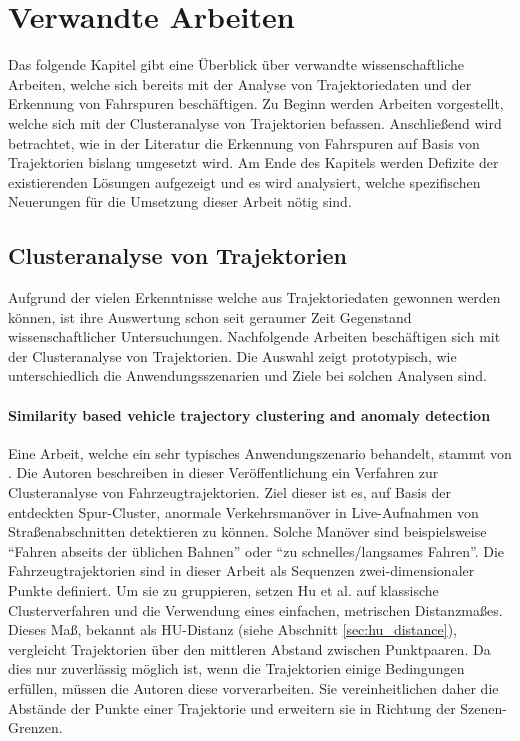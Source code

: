 ﻿%

\chapter{Verwandte Arbeiten}
\label{cha:related_work}

Das folgende Kapitel gibt eine Überblick über verwandte wissenschaftliche
Arbeiten, welche sich bereits mit der Analyse von Trajektoriedaten und der Erkennung von Fahrspuren beschäftigen.
Zu Beginn werden Arbeiten vorgestellt, welche sich mit der Clusteranalyse von Trajektorien befassen.
Anschließend wird betrachtet, wie in der Literatur die Erkennung von Fahrspuren auf Basis
von Trajektorien bislang umgesetzt wird.
Am Ende des Kapitels werden Defizite der existierenden Lösungen aufgezeigt und es wird analysiert, welche
spezifischen Neuerungen für die Umsetzung dieser Arbeit nötig sind.

\section{Clusteranalyse von Trajektorien}
\label{sec:rw_clustering}

Aufgrund der vielen Erkenntnisse welche aus Trajektoriedaten gewonnen werden können, ist ihre
Auswertung schon seit geraumer Zeit Gegenstand wissenschaftlicher Untersuchungen.
Nachfolgende Arbeiten beschäftigen sich mit der Clusteranalyse von Trajektorien.
Die Auswahl zeigt prototypisch, wie unterschiedlich die Anwendungsszenarien und Ziele bei solchen Analysen sind.

\subsubsection*{Similarity based vehicle trajectory clustering and anomaly detection}
Eine Arbeit, welche ein sehr typisches Anwendungszenario behandelt, stammt von \cite[]{Hu2005}. Die Autoren
beschreiben in dieser Veröffentlichung ein Verfahren zur Clusteranalyse von Fahrzeugtrajektorien. Ziel dieser
ist es, auf Basis der entdeckten Spur-Cluster, anormale Verkehrsmanöver in Live-Aufnahmen von Straßenabschnitten
detektieren zu können. Solche Manöver sind beispielsweise ``Fahren abseits der üblichen Bahnen'' oder
``zu schnelles/langsames Fahren''.
Die Fahrzeugtrajektorien sind in dieser Arbeit als Sequenzen zwei-dimensionaler Punkte definiert.
Um sie zu gruppieren, setzen Hu et al. auf klassische Clusterverfahren und die Verwendung eines
einfachen, metrischen Distanzmaßes. Dieses Maß, bekannt als HU-Distanz (siehe Abschnitt \ref{sec:hu_distance}),
vergleicht Trajektorien über den mittleren Abstand zwischen Punktpaaren.
Da dies nur zuverlässig möglich ist, wenn die Trajektorien einige Bedingungen erfüllen, müssen die
Autoren diese vorverarbeiten. Sie vereinheitlichen daher die Abstände der Punkte einer Trajektorie und erweitern
sie in Richtung der Szenen-Grenzen.

